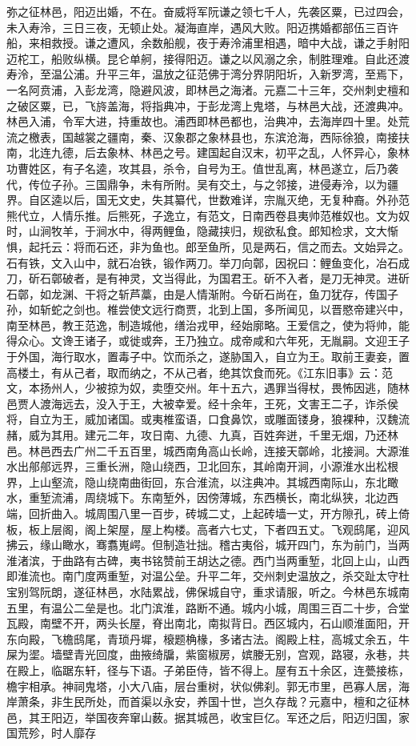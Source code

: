 \documentclass[12pt,UTF8]{ctexbook}
\begin{document}
弥之征林邑，阳迈出婚，不在。奋威将军阮谦之领七千人，先袭区粟，已过四会，未入寿泠，三日三夜，无顿止处。凝海直岸，遇风大败。阳迈携婚都部伍三百许船，来相救授。谦之遭风，余数船舰，夜于寿泠浦里相遇，暗中大战，谦之手射阳迈柁工，船败纵横。昆仑单舸，接得阳迈。谦之以风溺之余，制胜理难。自此还渡寿泠，至温公浦。升平三年，温放之征范佛于湾分界阴阳圻，入新罗湾，至焉下，一名阿贲浦，入彭龙湾，隐避风波，即林邑之海渚。元嘉二十三年，交州刺史檀和之破区粟，已，飞旍盖海，将指典冲，于彭龙湾上鬼塔，与林邑大战，还渡典冲。林邑入浦，令军大进，持重故也。浦西即林邑都也，治典冲，去海岸四十里。处荒流之檄表，国越裳之疆南，秦、汉象郡之象林县也，东滨沧海，西际徐狼，南接扶南，北连九德，后去象林、林邑之号。建国起自汉末，初平之乱，人怀异心，象林功曹姓区，有子名逵，攻其县，杀令，自号为王。值世乱离，林邑遂立，后乃袭代，传位子孙。三国鼎争，未有所附。吴有交土，与之邻接，进侵寿泠，以为疆界。自区逵以后，国无文史，失其纂代，世数难详，宗胤灭绝，无复种裔。外孙范熊代立，人情乐推。后熊死，子逸立，有范文，日南西卷县夷帅范椎奴也。文为奴时，山涧牧羊，于涧水中，得两鲤鱼，隐藏挟归，规欲私食。郎知检求，文大惭惧，起托云：将而石还，非为鱼也。郎至鱼所，见是两石，信之而去。文始异之。石有铁，文入山中，就石冶铁，锻作两刀。举刀向鄣，因祝曰：鲤鱼变化，冶石成刀，斫石鄣破者，是有神灵，文当得此，为国君王。斫不入者，是刀无神灵。进斫石鄣，如龙渊、干将之斩芦藁，由是人情渐附。今斫石尚在，鱼刀犹存，传国子孙，如斩蛇之剑也。椎尝使文远行商贾，北到上国，多所闻见，以晋愍帝建兴中，南至林邑，教王范逸，制造城他，缮治戎甲，经始廓略。王爱信之，使为将帅，能得众心。文谗王诸子，或徙或奔，王乃独立。成帝咸和六年死，无胤嗣。文迎王子于外国，海行取水，置毒子中。饮而杀之，遂胁国入，自立为王。取前王妻妾，置高楼土，有从己者，取而纳之，不从己者，绝其饮食而死。《江东旧事》云：范文，本扬州人，少被掠为奴，卖堕交州。年十五六，遇罪当得杖，畏怖因逃，随林邑贾人渡海远去，没入于王，大被幸爱。经十余年，王死，文害王二子，诈杀侯将，自立为王，威加诸国。或夷椎蛮语，口食鼻饮，或雕面镂身，狼裸种，汉魏流赭，威为其用。建元二年，攻日南、九德、九真，百姓奔迸，千里无烟，乃还林邑。林邑西去广州二千五百里，城西南角高山长岭，连接天鄣岭，北接涧。大源淮水出郍郍远界，三重长洲，隐山绕西，卫北回东，其岭南开涧，小源淮水出松根界，上山壑流，隐山绕南曲街回，东合淮流，以注典冲。其城西南际山，东北瞰水，重堑流浦，周绕城下。东南堑外，因傍薄城，东西横长，南北纵狭，北边西端，回折曲入。城周围八里一百步，砖城二丈，上起砖墙一丈，开方隙孔，砖上倚板，板上层阁，阁上架屋，屋上构楼。高者六七丈，下者四五丈。飞观鸱尾，迎风拂云，缘山瞰水，骞翥嵬崿。但制造壮拙。稽古夷俗，城开四门，东为前门，当两淮渚滨，于曲路有古碑，夷书铭赞前王胡达之德。西门当两重堑，北回上山，山西即淮流也。南门度两重堑，对温公垒。升平二年，交州刺史温放之，杀交趾太守杜宝别驾阮朗，遂征林邑，水陆累战，佛保城自守，重求请服，听之。今林邑东城南五里，有温公二垒是也。北门滨淮，路断不通。城内小城，周围三百二十步，合堂瓦殿，南壁不开，两头长屋，脊出南北，南拟背日。西区城内，石山顺淮面阳，开东向殿，飞檐鸱尾，青琐丹墀，榱题桷椽，多诸古法。阁殿上柱，高城丈余五，牛屎为埿。墙壁青光回度，曲掖绮牖，紫窗椒房，嫔媵无别，宫观，路寝，永巷，共在殿上，临踞东轩，径与下语。子弟臣侍，皆不得上。屋有五十余区，连甍接栋，檐宇相承。神祠鬼塔，小大八庙，层台重树，状似佛刹。郭无市里，邑寡人居，海岸萧条，非生民所处，而首渠以永安，养国十世，岂久存哉？元嘉中，檀和之征林邑，其王阳迈，举国夜奔窜山薮。据其城邑，收宝巨亿。军还之后，阳迈归国，家国荒殄，时人靡存
\end{document}
